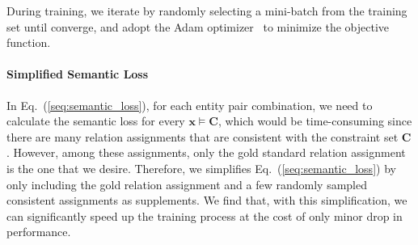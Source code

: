 During training, we iterate by randomly selecting a mini-batch from the training set until converge, and adopt the Adam optimizer~\cite{kingma2014adam} to minimize the objective function.
\paragraph{Simplified Semantic Loss}
In Eq.~(\ref{seq:semantic_loss}), for each entity pair combination, we need to calculate the semantic loss for every $\bm x \models \bm{C}$, which would be time-consuming since there are many relation assignments that are consistent with the constraint set $\bm{C}$.
However, among these assignments, only the gold standard relation assignment is the one that we desire.
Therefore, we simplifies Eq.~(\ref{seq:semantic_loss}) by only including the gold relation assignment and a few randomly sampled consistent assignments as supplements.
We find that, with this simplification, we can significantly speed up the training process at the cost of only minor drop in performance.





